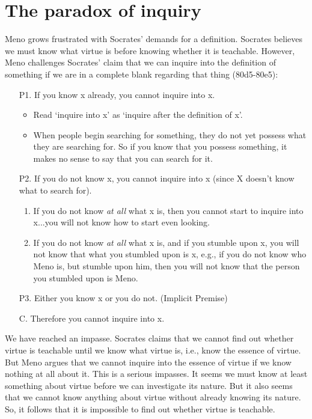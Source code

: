 \documentclass[10 pt]{article}
\begin{document}
\section*{The paradox of inquiry}
Meno grows frustrated with Socrates' demands for a definition. Socrates believes we must know what virtue is before knowing whether it is teachable. However, Meno challenges Socrates' claim that we can inquire into the definition of something if we are in a complete blank regarding that thing (80d5-80e5):


\begin{enumerate}
\item[P1.] If you know x already, you cannot inquire into x. 
\begin{itemize}
\item Read `inquire into x' as `inquire after the definition of x'. 
\item When people begin searching for something, they do not yet possess what they are searching for. So if you know that you possess something, it makes no sense to say that you can search for it.
\end{itemize}
\item[P2.] If you do not know x, you cannot inquire into x (since X doesn't know what to search for).
\begin{enumerate}
\item If you do not know \emph{at all} what x is, then you cannot start to inquire into x...you will not know how to start even looking.
\item If you do not know \emph{at all} what x is, and if you stumble upon x, you will not know that what you stumbled upon is x, e.g., if you do not know who Meno is, but stumble upon him, then you will not know that the person you stumbled upon is Meno. 
\end{enumerate}
\item[P3.] Either you know x or you do not. (Implicit Premise) 
\item[C.] Therefore you cannot inquire into x.
\end{enumerate}
We have reached an impasse.  Socrates claims that we cannot find out whether virtue is teachable until we know what virtue is, i.e., know the essence of virtue.  But Meno argues that we cannot inquire into the essence of virtue if we know nothing at all about it. This is a serious impasses. It seems we must know at least something about virtue before we can investigate its nature. But it also seems that we cannot know anything about virtue without already knowing its nature. So, it follows that it is impossible to find out whether virtue is teachable. 
\end{document}
